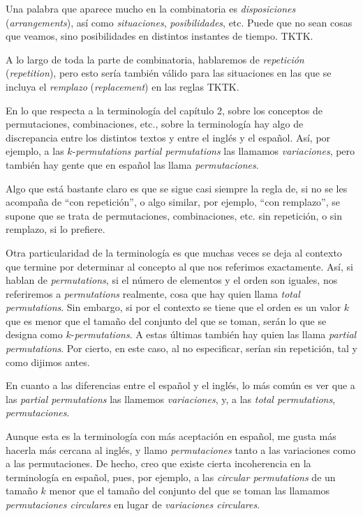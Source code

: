 


Una palabra que aparece mucho en la combinatoria es \emph{disposiciones}
(\emph{arrangements}), así como \emph{situaciones}, \emph{posibilidades}, etc.
Puede que no sean cosas que veamos, sino posibilidades en distintos
instantes de tiempo. TKTK.

A lo largo de toda la parte de combinatoria, hablaremos de \emph{repetición}
(\emph{repetition}), pero esto sería también válido para las situaciones en
las que se incluya el \emph{remplazo} (\emph{replacement}) en las reglas TKTK.

En lo que respecta a la terminología del capítulo 2, sobre los conceptos de
permutaciones, combinaciones, etc., sobre la terminología hay algo de
discrepancia entre los distintos textos y entre el inglés y el español. Así,
por ejemplo, a las $k$-\emph{permutations} \emph{partial permutations} las
llamamos \emph{variaciones}, pero también hay gente que en español las llama
\emph{permutaciones}.

Algo que está bastante claro es que se sigue casi siempre la regla de, si no
se les acompaña de ``con repetición'', o algo similar, por ejemplo, ``con
remplazo'', se supone que se trata de permutaciones, combinaciones, etc. sin
repetición, o sin remplazo, si lo prefiere. 

Otra particularidad de la terminología es que muchas veces se deja al
contexto que termine por determinar al concepto al que nos referimos
exactamente. Así, si hablan de \emph{permutations}, si el número de
elementos y el orden son iguales, nos referiremos a \emph{permutations}
realmente, cosa que hay quien llama \emph{total permutations}. Sin embargo,
si por el contexto se tiene que el orden es un valor $k$ que es menor que el
tamaño del conjunto del que se toman, serán lo que se designa como
$k$-\emph{permutations}. A estas últimas también hay quien las llama
\emph{partial permutations}. Por cierto, en este caso, al no especificar,
serían sin repetición, tal y como dijimos antes.

En cuanto a las diferencias entre el español y el inglés, lo más común es
ver que a las \emph{partial permutations} las llamemos \emph{variaciones}, y, a
las \emph{total permutations}, \emph{permutaciones}.

Aunque esta es la terminología con más aceptación en español, me gusta más
hacerla más cercana al inglés, y llamo \emph{permutaciones} tanto a las
variaciones como a las permutaciones. De hecho, creo que existe cierta
incoherencia en la terminología en español, pues, por ejemplo, a las
\emph{circular permutations} de un tamaño $k$ menor que el tamaño del
conjunto del que se toman las llamamos \emph{permutaciones circulares} en lugar
de \emph{variaciones circulares}.









